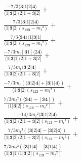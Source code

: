\documentclass[varwidth, border=5pt]{standalone}
\begin{document}
\begin{my}
$\begin{gathered}
\scriptscriptstyle\frac{-7/3⟨𝟑|1|2|𝟒⟩}{⟨1|𝟑|2]⟨2|1+𝟑|2]} +\\
\scriptscriptstyle\frac{7/3⟨𝟑|1|2|𝟒⟩}{⟨1|𝟑|2](s_{12𝟑}-m_t²)} +\\
\scriptscriptstyle\frac{7/3⟨𝟑𝟒⟩⟨1|𝟑|1]}{⟨1|𝟑|2](s_{12𝟑}-m_t²)} +\\
\scriptscriptstyle\frac{-7/3m_t[𝟑1]⟨2𝟒⟩}{⟨1|𝟑|1]⟨2|1+𝟑|2]} +\\
\scriptscriptstyle\frac{7/3m_t⟨𝟑|2|𝟒]}{⟨1|𝟑|2]⟨2|1+𝟑|2]} +\\
\scriptscriptstyle\frac{-7/3m_t(⟨𝟑|2|𝟒]+[𝟑|1|𝟒⟩)}{⟨1|𝟑|2](s_{12𝟑}-m_t²)} +\\
\scriptscriptstyle\frac{7/3m_t²(⟨𝟑𝟒⟩-[𝟑𝟒])}{⟨1|𝟑|2](s_{12𝟑}-m_t²)} +\\
\scriptscriptstyle\frac{-14/3m_t²⟨𝟑|1|2|𝟒⟩}{⟨1|𝟑|2]⟨2|1+𝟑|2](s_{12𝟑}-m_t²)} +\\
\scriptscriptstyle\frac{7/3m_t³(⟨𝟑|2|𝟒]-[𝟑|2|𝟒⟩)}{⟨1|𝟑|2]⟨2|1+𝟑|2](s_{12𝟑}-m_t²)} +\\
\scriptscriptstyle\frac{7/3m_t³(⟨𝟑|1|𝟒]-[𝟑|1|𝟒⟩)}{⟨1|𝟑|1]⟨1|𝟑|2](s_{12𝟑}-m_t²)} \phantom{+}
\end{gathered}$
\end{my}
\end{document}
